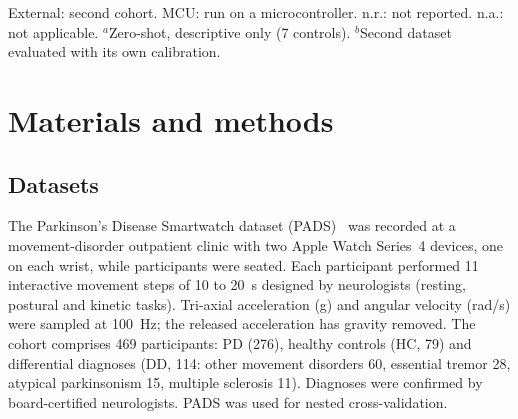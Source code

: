 \documentclass[preprint,12pt]{elsarticle}
\begin{document}
\begin{table}[!t]
\caption{Comparison with prior work.}
\label{tab:related}
\centering\small\setlength{\tabcolsep}{4pt}

\vspace{2pt}\parbox{\linewidth}{\footnotesize External: second cohort. MCU: run on a microcontroller. n.r.: not reported. n.a.: not applicable. $^{a}$Zero-shot, descriptive only (7 controls). $^{b}$Second dataset evaluated with its own calibration.}
\end{table}

\section{Materials and methods}
\label{sec:methods}
\subsection{Datasets}
The Parkinson's Disease Smartwatch dataset (PADS)~\cite{Varghese2024,PADSdata} was recorded at a movement-disorder outpatient clinic with two Apple Watch Series~4 devices, one on each wrist, while participants were seated. Each participant performed 11 interactive movement steps of 10 to 20~s designed by neurologists (resting, postural and kinetic tasks). Tri-axial acceleration (g) and angular velocity (rad/s) were sampled at 100~Hz; the released acceleration has gravity removed. The cohort comprises 469 participants: PD (276), healthy controls (HC, 79) and differential diagnoses (DD, 114: other movement disorders 60, essential tremor 28, atypical parkinsonism 15, multiple sclerosis 11). Diagnoses were confirmed by board-certified neurologists. PADS was used for nested cross-validation.
\end{document}
